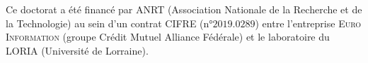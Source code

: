 \begin{ThesisFundings}

	Ce doctorat a été financé par \textsc{ANRT} (Association Nationale de la Recherche et de la Technologie)
	au sein d'un contrat \textsc{CIFRE} (n°$2019.0289$)
	entre l'entreprise \textsc{Euro Information} (groupe Crédit Mutuel Alliance Fédérale)
	et le laboratoire du \textsc{LORIA} (Université de Lorraine).

\end{ThesisFundings}